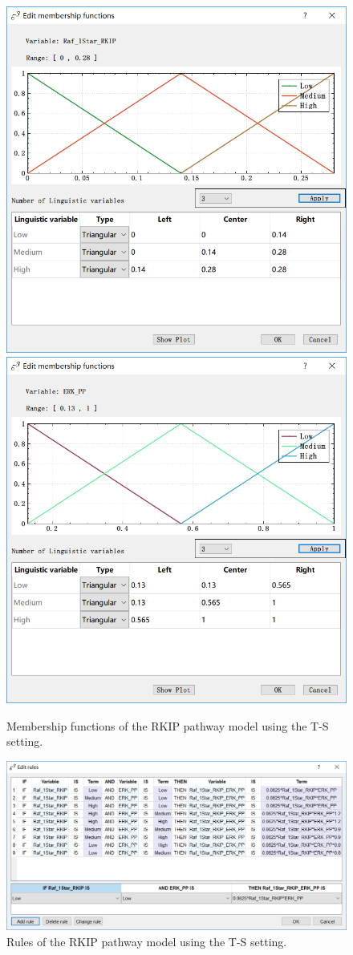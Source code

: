 \documentclass[journal,a4paper,onecolumn]{article}
\begin{document}
\begin{figure}[!hbt]
	\begin{center}
		\includegraphics[width=0.45\columnwidth]{fig44}
		\includegraphics[width=0.45\columnwidth]{fig45}
		\caption{Membership functions of the RKIP pathway model using the T-S setting.}
		\label{fig:Membership functions of RKIP using T-S.}
	\end{center}
\end{figure}

\begin{figure}[!hbt]
	\begin{center}
		\includegraphics[width=\columnwidth]{fig46}
		\caption{Rules of the RKIP pathway model using the T-S setting.}
		\label{fig:Rules of RKIP using T-S.}
	\end{center}
\end{figure}
\end{document}
